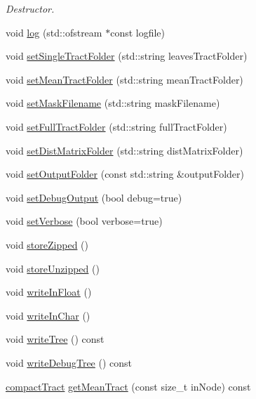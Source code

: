 \begin{DoxyCompactItemize}
\begin{DoxyCompactList}\small\item\em \-Destructor. \end{DoxyCompactList}\item 
void \hyperlink{classtreeManager_afbf5b1746f6138271b30b4bd842a5d1c}{log} (std\-::ofstream $\ast$const logfile)
\item 
void \hyperlink{classtreeManager_ad804453bb4285279f8122a613396effb}{set\-Single\-Tract\-Folder} (std\-::string leaves\-Tract\-Folder)
\item 
void \hyperlink{classtreeManager_a660316bb69290d9cfe589631d648d57c}{set\-Mean\-Tract\-Folder} (std\-::string mean\-Tract\-Folder)
\item 
void \hyperlink{classtreeManager_a7965cdbf1170bc6c467a750eab038b2d}{set\-Mask\-Filename} (std\-::string mask\-Filename)
\item 
void \hyperlink{classtreeManager_a545f83635c324513afcdf2e0e00494d0}{set\-Full\-Tract\-Folder} (std\-::string full\-Tract\-Folder)
\item 
void \hyperlink{classtreeManager_a8d3e4b90d16d72351916b36b3dc5a253}{set\-Dist\-Matrix\-Folder} (std\-::string dist\-Matrix\-Folder)
\item 
void \hyperlink{classtreeManager_a7b88c9f66920d36c844ebb7b60f9a034}{set\-Output\-Folder} (const std\-::string \&output\-Folder)
\item 
void \hyperlink{classtreeManager_a953592c0a2aeff6f1d04a1ff7dd9d75a}{set\-Debug\-Output} (bool debug=true)
\item 
void \hyperlink{classtreeManager_aec16c4359c316c1a2f099e8473b7f8c6}{set\-Verbose} (bool verbose=true)
\item 
void \hyperlink{classtreeManager_a2b891cc795aca197456b17eb348f314e}{store\-Zipped} ()
\item 
void \hyperlink{classtreeManager_a9cb02caae81e4689fd8f7a16aaa8bcbb}{store\-Unzipped} ()
\item 
void \hyperlink{classtreeManager_ab9d4c3d03ece6c075b366ab32c699aef}{write\-In\-Float} ()
\item 
void \hyperlink{classtreeManager_a02d12cbbba50e932d7c9ad8c91020437}{write\-In\-Char} ()
\item 
void \hyperlink{classtreeManager_a6fa366041fd3b53b75ecd3e898c23539}{write\-Tree} () const 
\item 
void \hyperlink{classtreeManager_a6dc07cc6b0dedad56a63018ccba6c4e1}{write\-Debug\-Tree} () const 
\item 
\hyperlink{classcompactTract}{compact\-Tract} \hyperlink{classtreeManager_a67c3a0981747007ff271d34350edb8b8}{get\-Mean\-Tract} (const size\-\_\-t in\-Node) const 

\end{DoxyCompactItemize}
